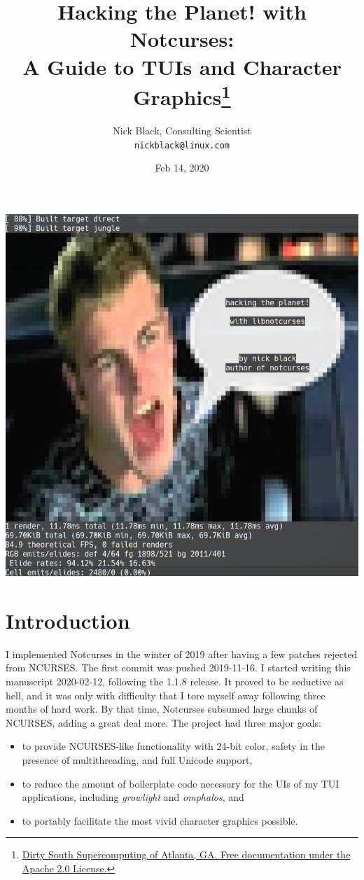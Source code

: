 \documentclass[letterpaper,10pt]{article}
\title{Hacking the Planet! with Notcurses:\\
A Guide to TUIs and Character Graphics\thanks{
 \href{https://www.dsscaw.com/}{Dirty South Supercomputing of Atlanta, GA. Free documentation under the Apache 2.0 License.}
}\\
}
\author{Nick Black, Consulting Scientist\\
\texttt{nickblack@linux.com}
}
\newenvironment{denseitemize}{
  \begin{itemize}
      \setlength{\itemsep}{0pt}
}{
  \end{itemize}
}
\begin{document}
\date{Feb 14, 2020}
\maketitle
\thispagestyle{fancy}
\date{}
\vspace{1in}
\begin{center}
\includegraphics[width=.75\linewidth]{htp-with-notcurses.png}
\end{center}

\clearpage

\tableofcontents

\clearpage

\section{Introduction}

I implemented Notcurses in the winter of 2019 after having a few patches
rejected from NCURSES. The first commit was pushed 2019-11-16. I started
writing this manuscript 2020-02-12, following the 1.1.8 release. It proved to
be seductive as hell, and it was only with difficulty that I tore myself away
following three months of hard work. By that time, Notcurses subsumed large
chunks of NCURSES, adding a great deal more. The project had three
major goals:

\begin{denseitemize}
\item to provide NCURSES-like functionality with 24-bit color, safety in the
    presence of multithreading, and full Unicode support,
\item to reduce the amount of boilerplate code necessary for the UIs of my
    TUI applications, including \textit{growlight} and \textit{omphalos}, and
\item to portably facilitate the most vivid character graphics possible.
\end{denseitemize}
\end{document}
